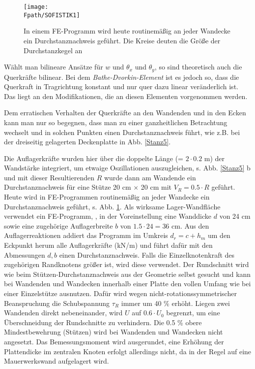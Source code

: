\begin{figure}[tbp]
\centering
\if {} \sidecaption \fi
\texttt{[image: \\Fpath/SOFISTIK1]}
\caption{In einem FE-Programm wird heute routinem\"{a}{\ss}ig an jeder Wandecke ein
Durchstanznachweis gef\"{u}hrt. Die Kreise deuten die Gr\"{o}{\ss}e der Durchstanzkegel an }
\label{Sofistik1}
\end{figure}%

W\"{a}hlt man bilineare Ans\"{a}tze f\"{u}r $w$ und $\theta_x$ und $\theta_y$, so sind theoretisch auch die Querkr\"{a}fte bilinear. Bei dem {\em Bathe-Dvorkin-Element\/} ist es jedoch so, dass die Querkraft in Tragrichtung konstant und nur quer dazu linear ver\"{a}nderlich ist. Das liegt an den Modifikationen, die an diesen Elementen vorgenommen werden.

Dem erratischen Verhalten der Querkr\"{a}fte an den Wandenden und in den Ecken kann man nur so begegnen, dass man zu einer \glq ganzheitlichen\grq{} Betrachtung wechselt und in solchen Punkten einen Durchstanznachweis f\"{u}hrt, wie z.B. bei der dreiseitig gelagerten Deckenplatte in Abb. \ref{Stanz5}.

Die Auflagerkr\"{a}fte wurden hier \"{u}ber die doppelte L\"{a}nge (= $2 \cdot 0.2$ m) der Wandst\"{a}rke integriert, um etwaige Oszillationen auszugleichen, s. Abb. \ref{Stanz5} b und mit dieser Resultierenden $R$ wurde dann am Wandende ein Durchstanznachweis f\"{u}r eine St\"{u}tze 20 cm $\times $ 20 cm mit $V_R = 0.5 \cdot R$ gef\"{u}hrt.\\

{\small Heute wird in FE-Programmen routinem\"{a}{\ss}ig an jeder Wandecke ein Durchstanznachweis gef\"{u}hrt, s. Abb. \ref{Sofistik1}. Als wirksame Lager-Wandfl\"{a}che verwendet ein FE-Programm, \cite{Sofistik}, in der Voreinstellung eine Wanddicke $d$ von 24 cm sowie eine zugeh\"{o}rige Auflagerbreite $b$ von $1.5 \cdot 24 = 36$ cm. Aus den Auflagerreaktionen addiert das Programm im Umkreis $d_r = c + h_m$ um den Eckpunkt herum alle Auflagerkr\"{a}fte (kN/m) und f\"{u}hrt daf\"{u}r mit den Abmessungen $d, b$ einen Durchstanznachweis. Falls die Einzelknotenkraft des zugeh\"{o}rigen Randknotens gr\"{o}{\ss}er ist, wird diese verwendet. Der Rundschnitt wird wie beim St\"{u}tzen-Durchstanznachweis aus der Geometrie selbst gesucht und kann bei Wandenden und Wandecken innerhalb einer Platte den vollen Umfang wie bei einer Einzelst\"{u}tze ausnutzen. Daf\"{u}r wird wegen nicht-rotationssymmetrischer Beanspruchung die Schubspannung $\tau_R$ immer um 40 \% erh\"{o}ht. Liegen zwei Wandenden direkt nebeneinander, wird $U$ auf $0.6 \cdot U_0$ begrenzt, um eine \"{U}berschneidung der Rundschnitte zu verhindern. Die 0.5 \% obere Mindestbewehrung (St\"{u}tzen) wird bei Wandenden und Wandecken nicht angesetzt. Das Bemessungsmoment wird ausgerundet, eine Erh\"{o}hung der Plattendicke im zentralen Knoten erfolgt allerdings nicht, da in der Regel auf eine Mauerwerkswand aufgelagert wird. }  %


